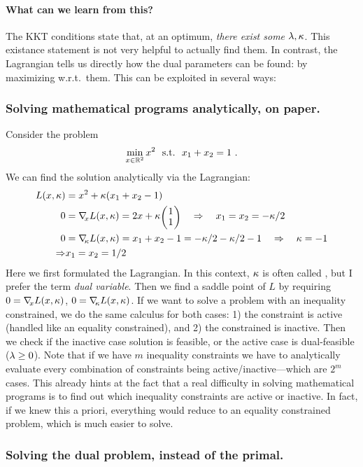 \paragraph{What can we learn from this?} The KKT conditions state that, at an optimum, \emph{there
exist some} $\lambda,\kappa$. This existance statement is not very helpful to
actually find them. In contrast, the Lagrangian tells us directly how
the dual parameters can be found: by maximizing w.r.t.\ them. This can
be exploited in several ways:

\subsubsection{Solving mathematical programs analytically, on paper.}

Consider the problem
\begin{equation}
\min_{x\in{\mathbb{R}}^2} x^2 ~~\text{s.t.}~~ x_1+x_2 = 1 ~.
\end{equation}
We can
find the solution analytically via the Lagrangian:
\begin{align}
L(x,\k)
 &= x^2 + \k(x_1+x_2-1)\\
0
 &= \na_x L(x,\k)
  = 2 x + \k\mat{c}{1\\1} \quad\To\quad x_1=x_2=-\k/2\\
0
 &= \na_\k L(x,\k)
  = x_1+x_2-1 = -\k/2-\k/2-1 \quad\To\quad \k=-1 \\
\To
 & x_1=x_2=1/2
\end{align}
Here we first formulated the Lagrangian. In this context, $\kappa$ is
often called , but I prefer the term
\emph{dual variable}. Then we find a saddle point of $L$ by requiring
$0 = {\nabla_{\!\!}}_x L(x,\kappa)$, $0 = {\nabla_{\!\!}}_\kappa L(x,\kappa)$. If we want to solve a
problem with an inequality constrained, we do the same calculus for
both cases: 1) the constraint is active (handled like an equality
constrained), and 2) the constrained is inactive. Then we check if the
inactive case solution is feasible, or the active case is
dual-feasible ($\lambda\ge 0$). Note that if we have $m$ inequality
constraints we have to analytically evaluate every combination of
constraints being active/inactive---which are $2^m$ cases. This
already hints at the fact that a real difficulty in solving
mathematical programs is to find out which inequality constraints are
active or inactive. In fact, if we knew this a priori, everything
would reduce to an equality constrained problem, which is much easier
to solve.

\subsubsection{Solving the dual problem, instead of the primal.}

